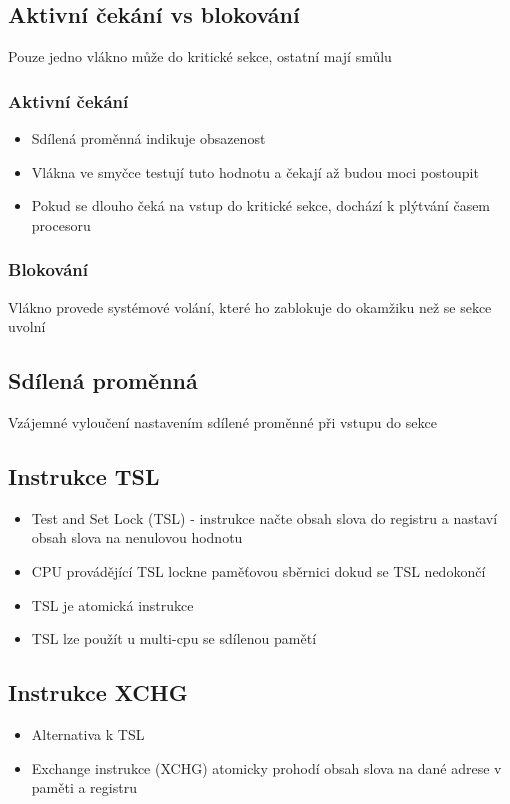 \documentclass{szzclass}
\begin{document}
\subsection{Aktivní čekání vs blokování}

Pouze jedno vlákno může do kritické sekce, ostatní mají smůlu

\subsubsection{Aktivní čekání}

\begin{itemize}
\item Sdílená proměnná indikuje obsazenost
\item Vlákna ve smyčce testují tuto hodnotu a čekají až budou moci postoupit
\item Pokud se dlouho čeká na vstup do kritické sekce, dochází k plýtvání časem procesoru
\end{itemize}

\subsubsection{Blokování}

Vlákno provede systémové volání, které ho zablokuje do okamžiku než se sekce uvolní

\subsection{Sdílená proměnná}

Vzájemné vyloučení nastavením sdílené proměnné při vstupu do sekce

\subsection{Instrukce TSL}
\begin{itemize}
    \item Test and Set Lock (TSL) - instrukce načte obsah slova do registru a nastaví obsah slova na nenulovou hodnotu
    \item CPU provádějící TSL lockne paměťovou sběrnici dokud se TSL nedokončí
    \item TSL je atomická instrukce
    \item TSL lze použít u multi-cpu se sdílenou pamětí
\end{itemize}


\subsection{Instrukce XCHG}
\begin{itemize}
    \item Alternativa k TSL
    \item Exchange instrukce (XCHG) atomicky prohodí obsah slova na dané adrese v paměti a registru
\end{itemize}
\end{document}
